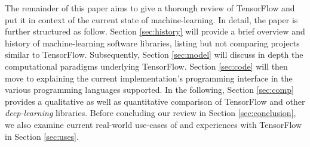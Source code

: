 The remainder of this paper aims to give a thorough review of TensorFlow and put
it in context of the current state of machine-learning. In detail, the paper is
further structured as follow. Section \ref{sec:history} will provide a brief
overview and history of machine-learning software libraries, listing but not
comparing projects similar to TensorFlow. Subsequently, Section \ref{sec:model}
will discuss in depth the computational paradigms underlying TensorFlow. Section
\ref{sec:code} will then move to explaining the current implementation's
programming interface in the various programming languages supported. In the
following, Section \ref{sec:comp} provides a qualitative as well as quantitative
comparison of TensorFlow and other \emph{deep-learning} libraries. Before
concluding our review in Section \ref{sec:conclusion}, we also examine current
real-world use-cases of and experiences with TensorFlow in Section
\ref{sec:uses}.
